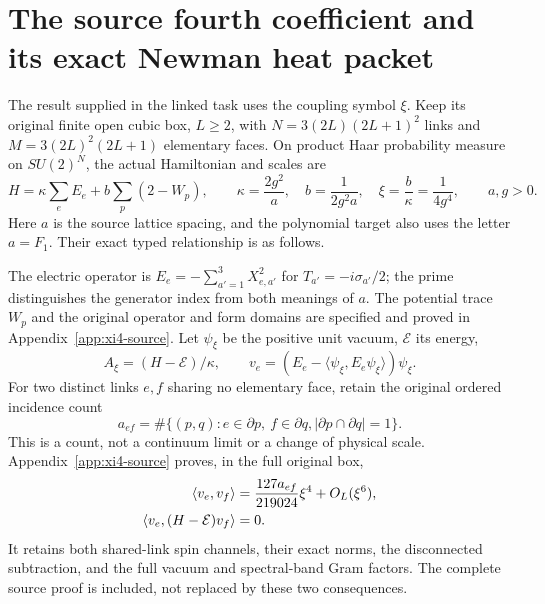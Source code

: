 \section{The source fourth coefficient and its exact Newman heat packet}
\label{sec:xi4-packet}

The result supplied in the linked task uses the coupling symbol $\xi$.
Keep its original finite open cubic box, $L\ge2$, with
$N=3(2L)(2L+1)^2$ links and $M=3(2L)^2(2L+1)$ elementary faces.
On product Haar probability measure on $SU(2)^N$, the actual Hamiltonian
and scales are
\[
H=\kappa\sum_e E_e+b\sum_p(2-W_p),\qquad
\kappa=\frac{2g^2}{a},\quad b=\frac1{2g^2a},\quad
\xi=\frac b\kappa=\frac1{4g^4},\qquad a,g>0.
\]
Here $a$ is the source lattice spacing, and the polynomial target also
uses the letter $a=F_1$. Their exact typed relationship is as follows.

The electric operator is
$E_e=-\sum_{a'=1}^3X_{e,a'}^2$ for $T_{a'}=-i\sigma_{a'}/2$;
the prime distinguishes the generator index from both meanings of $a$.
The potential trace $W_p$ and the original operator and form domains
are specified and proved in Appendix~\ref{app:xi4-source}.
Let $\psi_\xi$ be the positive unit vacuum, $\mathcal E$ its energy,
\[
A_\xi=(H-\mathcal E)/\kappa,\qquad
v_e=(E_e-\langle\psi_\xi,E_e\psi_\xi\rangle)\psi_\xi.
\]
For two distinct links $e,f$ sharing no elementary face, retain the
original ordered incidence count
\[
a_{ef}=\#\{(p,q):e\in\partial p,\ f\in\partial q,
                    |\partial p\cap\partial q|=1\}.
\]
This is a count, not a continuum limit or a change of physical scale.
Appendix~\ref{app:xi4-source} proves, in the full original box,
\begin{align}
\langle v_e,v_f\rangle
 &=\frac{127a_{ef}}{219024}\xi^4+O_L(\xi^6),\notag\\
\langle v_e,(H-\mathcal E)v_f\rangle&=0.
\label{x4:source-moments}
\end{align}
It retains both shared-link spin channels, their exact norms, the
disconnected subtraction, and the full vacuum and spectral-band Gram
factors. The complete source proof is included, not replaced by these
two consequences.


